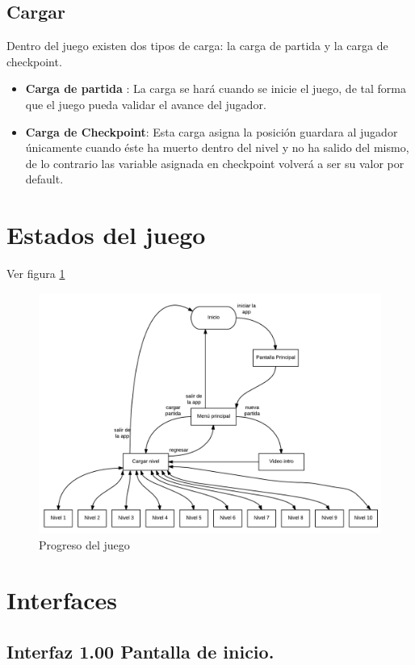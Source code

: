 \documentclass[11pt,letterpaper]{article}
\begin{document}
	\subsection{Cargar}
Dentro del juego existen dos tipos de carga: la carga de partida y la carga de checkpoint.
 \begin{itemize}
 	\item \textbf{ Carga de partida }: La carga se hará cuando se inicie el juego, de tal forma que el juego pueda validar el avance del jugador. 
 	\item \textbf{Carga de Checkpoint}:  Esta carga asigna la posición guardara al jugador únicamente cuando éste ha muerto dentro del nivel y no ha salido del mismo, de lo contrario las variable asignada en checkpoint volverá a ser su valor por default.
 \end{itemize}

	
\section{Estados del juego}
Ver figura \ref{fig:EstadosJuego}
\begin{figure}
  \centering
     \includegraphics[width=\linewidth]{Imagenes/estadosJuego}
  \caption{Progreso del juego}
  \label{fig:EstadosJuego}
\end{figure} 



\section{Interfaces}
	\subsection{Interfaz 1.00 Pantalla de inicio.}
\end{document}
